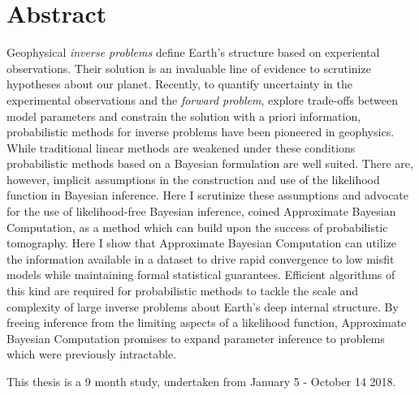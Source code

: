 \chapter{Abstract}

Geophysical \textit{inverse problems} define Earth's structure based on experiental observations. Their solution is an invaluable line of evidence to scrutinize hypotheses about our planet. Recently, to quantify uncertainty in the experimental observations and the \textit{forward problem}, explore trade-offs between model parameters and constrain the solution with a priori information, probabilistic methods for inverse problems have been pioneered in geophysics. While traditional linear methods are weakened under these conditions probabilistic methods based on a Bayesian formulation are well suited.  There are, however, implicit assumptions in the construction and use of the likelihood function in Bayesian inference. Here I scrutinize these assumptions and advocate for the use of likelihood-free Bayesian inference, coined Approximate Bayesian Computation, as a method which can build upon the success of probabilistic tomography. Here I show that Approximate Bayesian Computation can utilize the information available in a dataset to drive rapid convergence to low misfit models while maintaining formal statistical guarantees. Efficient algorithms of this kind are required for probabilistic methods to tackle the scale and complexity of large inverse problems about Earth’s deep internal structure. By freeing inference from the limiting aspects of a likelihood function, Approximate Bayesian Computation promises to expand parameter inference to problems which were previously intractable. \par
This thesis is a 9 month study, undertaken from January 5 - October 14 2018. 
